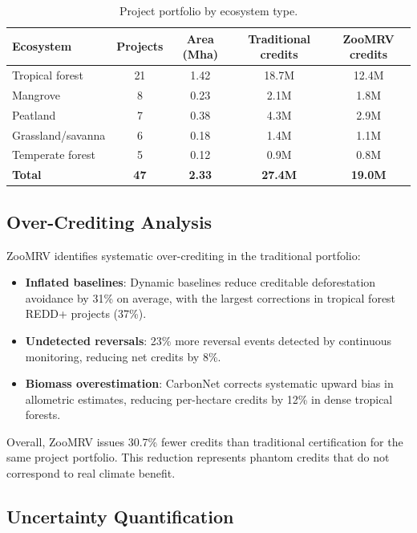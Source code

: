 \documentclass[11pt,a4paper]{article}
\begin{document}
\begin{table}[H]
\centering
\caption{Project portfolio by ecosystem type.}
\label{tab:portfolio}
\begin{tabular}{lcccc}
\toprule
\textbf{Ecosystem} & \textbf{Projects} & \textbf{Area (Mha)} &
  \textbf{Traditional credits} & \textbf{ZooMRV credits} \\
\midrule
Tropical forest & 21 & 1.42 & 18.7M & 12.4M \\
Mangrove & 8 & 0.23 & 2.1M & 1.8M \\
Peatland & 7 & 0.38 & 4.3M & 2.9M \\
Grassland/savanna & 6 & 0.18 & 1.4M & 1.1M \\
Temperate forest & 5 & 0.12 & 0.9M & 0.8M \\
\midrule
\textbf{Total} & \textbf{47} & \textbf{2.33} & \textbf{27.4M} &
  \textbf{19.0M} \\
\bottomrule
\end{tabular}
\end{table}

\subsection{Over-Crediting Analysis}

ZooMRV identifies systematic over-crediting in the traditional portfolio:

\begin{itemize}
  \item \textbf{Inflated baselines}: Dynamic baselines reduce creditable
    deforestation avoidance by 31\% on average, with the largest
    corrections in tropical forest REDD+ projects (37\%).
  \item \textbf{Undetected reversals}: 23\% more reversal events
    detected by continuous monitoring, reducing net credits by 8\%.
  \item \textbf{Biomass overestimation}: CarbonNet corrects systematic
    upward bias in allometric estimates, reducing per-hectare credits by
    12\% in dense tropical forests.
\end{itemize}

Overall, ZooMRV issues 30.7\% fewer credits than traditional
certification for the same project portfolio. This reduction represents
phantom credits that do not correspond to real climate benefit.

\subsection{Uncertainty Quantification}
\end{document}
